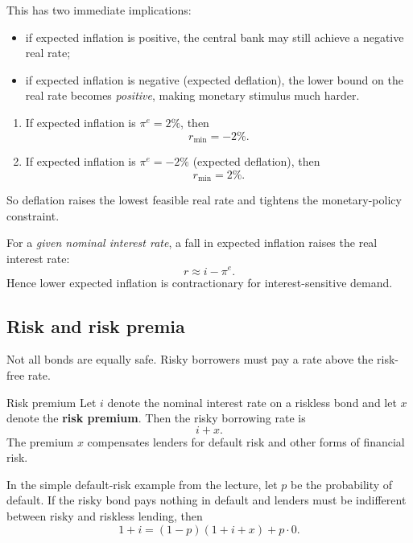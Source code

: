 \noindent
This has two immediate implications:
\begin{itemize}[leftmargin=1.5em]
    \item if expected inflation is positive, the central bank may still achieve a negative real rate;
    \item if expected inflation is negative (expected deflation), the lower bound on the real rate becomes \emph{positive}, making monetary stimulus much harder.
\end{itemize}

\begin{examplebox}[title={Worked Example: Real-rate lower bound}]
\begin{enumerate}[label=(\alph*)]
    \item If expected inflation is $\pi^e=2\%$, then
    \[
    r_{\min} = -2\%.
    \]
    \item If expected inflation is $\pi^e=-2\%$ (expected deflation), then
    \[
    r_{\min} = 2\%.
    \]
\end{enumerate}
So deflation raises the lowest feasible real rate and tightens the monetary-policy constraint.
\end{examplebox}

\begin{examtip}[title={Exam Focus: Expected inflation and the real rate}]
For a \emph{given nominal interest rate}, a fall in expected inflation raises the real interest rate:
\[
r \approx i-\pi^e.
\]
Hence lower expected inflation is contractionary for interest-sensitive demand.
\end{examtip}

\subsection{Risk and risk premia}

Not all bonds are equally safe. Risky borrowers must pay a rate above the risk-free rate.

\begin{definition}{Risk premium}{}
Let $i$ denote the nominal interest rate on a riskless bond and let $x$ denote the \textbf{risk premium}. Then the risky borrowing rate is
\[
i+x.
\]
The premium $x$ compensates lenders for default risk and other forms of financial risk.
\end{definition}

\noindent
In the simple default-risk example from the lecture, let $p$ be the probability of default. If the risky bond pays nothing in default and lenders must be indifferent between risky and riskless lending, then
\[
1+i = (1-p)(1+i+x)+p\cdot 0.
\]

